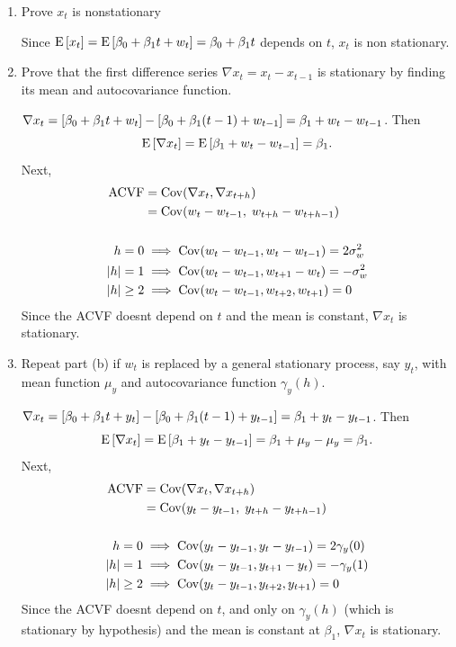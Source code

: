 \documentclass[12pt]{article}
\def\Cov{\operatorname{Cov}} %
\newcommand{\nl}{\vspace{0.1in}\noindent}
\begin{document}
\begin{enumerate}[label=(\alph*)]
    \item Prove $x_t$ is nonstationary
    
    \nl \soln* Since $\Eb{x_t} = \Eb{\beta_0 + \beta_1 t + w_t} = \beta_0 + \beta_1 t$ depends on $t$, $x_t$ is non stationary.
    \item Prove that the first difference series $\nabla x_t = x_t - x_{t-1}$ is stationary by finding its mean and autocovariance function.
    
    \nl \soln* $\nabla x_t = \brac{\beta_0 + \beta_1 t + w_t} - \brac{\beta_0 + \beta_1(t-1) + w_{t-1}} = \beta_1 + w_t - w_{t-1}$. Then $$\Eb{\nabla x_t} = \Eb{\beta_1 + w_t - w_{t-1}} = \beta_1.$$
    Next, \begin{align*}
        \operatorname{ACVF} &= \Cov(\nabla x_t, \nabla x_{t+h})\\
        &= \Cov(w_t - w_{t-1}, \; w_{t+h}- w_{t+h-1})\\
        & \\
        h=0 &\implies \Cov(w_t - w_{t-1}, w_t - w_{t-1}) = 2\sigma_w^2\\
        \abs{h}=1 &\implies \Cov(w_t - w_{t-1}, w_{t+1} - w_{t}) = -\sigma_w^2\\
        \abs{h}\geq 2 &\implies \Cov(w_t - w_{t-1}, w_{t+2}, w_{t+1}) = 0
    \end{align*} 
    Since the ACVF doesnt depend on $t$ and the mean is constant, $\nabla x_t$ is stationary.


    \item Repeat part (b) if $w_t$ is replaced by a general stationary process, say $y_t$, with mean function $\mu_y$ and autocovariance function $\gamma_y(h)$.
    
    \nl \soln* $\nabla x_t = \brac{\beta_0 + \beta_1 t + y_t} - \brac{\beta_0 + \beta_1(t-1) + y_{t-1}} = \beta_1 + y_t - y_{t-1}$. Then $$\Eb{\nabla x_t} = \Eb{\beta_1 + y_t - y_{t-1}} = \beta_1 + \mu_y - \mu_y = \beta_1.$$
    Next, \begin{align*}
        \operatorname{ACVF} &= \Cov(\nabla x_t, \nabla x_{t+h})\\
        &= \Cov(y_t - y_{t-1}, \; y_{t+h}- y_{t+h-1})\\
        & \\
        h=0 &\implies \Cov(y_t - y_{t-1}, y_t - y_{t-1}) = 2 \gamma_y(0)\\
        \abs{h}=1 &\implies \Cov(y_t - y_{t-1}, y_{t+1} - y_{t}) = - \gamma_y(1)\\
        \abs{h}\geq 2 &\implies \Cov(y_t - y_{t-1}, y_{t+2}, y_{t+1}) = 0
    \end{align*} 
    Since the ACVF doesnt depend on $t$, and only on $\gamma_y(h)$ (which is stationary by hypothesis) and the mean is constant at $\beta_1$, $\nabla x_t$ is stationary.
\end{enumerate}
\end{document}
